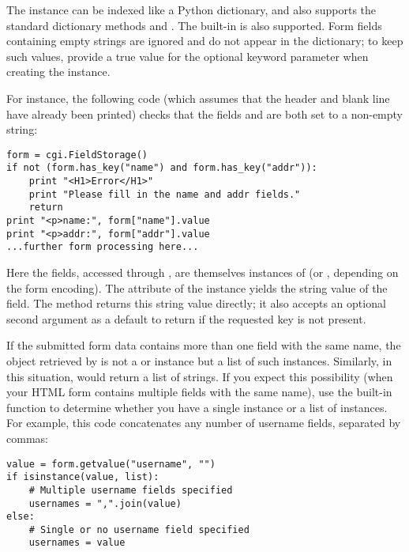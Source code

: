 The  instance can be indexed like a Python
dictionary, and also supports the standard dictionary methods
 and .  The built-in 
is also supported.  Form fields containing empty strings are ignored
and do not appear in the dictionary; to keep such values, provide
a true value for the optional  keyword
parameter when creating the  instance.

For instance, the following code (which assumes that the 
 header and blank line have already been
printed) checks that the fields  and  are both
set to a non-empty string:

\begin{verbatim}
form = cgi.FieldStorage()
if not (form.has_key("name") and form.has_key("addr")):
    print "<H1>Error</H1>"
    print "Please fill in the name and addr fields."
    return
print "<p>name:", form["name"].value
print "<p>addr:", form["addr"].value
...further form processing here...
\end{verbatim}

Here the fields, accessed through , are
themselves instances of  (or
, depending on the form encoding).
The  attribute of the instance yields the string value
of the field.  The  method returns this string value
directly; it also accepts an optional second argument as a default to
return if the requested key is not present.

If the submitted form data contains more than one field with the same
name, the object retrieved by  is not a
 or 
instance but a list of such instances.  Similarly, in this situation,
 would return a list of strings.
If you expect this possibility
(when your HTML form contains multiple fields with the same name), use
the  built-in function to determine whether you
have a single instance or a list of instances.  For example, this
code concatenates any number of username fields, separated by
commas:

\begin{verbatim}
value = form.getvalue("username", "")
if isinstance(value, list):
    # Multiple username fields specified
    usernames = ",".join(value)
else:
    # Single or no username field specified
    usernames = value
\end{verbatim}

